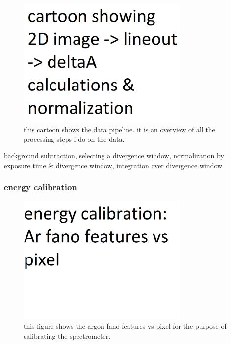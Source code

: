 \begin{figure}
	\centering
	\includegraphics[width=0.75\textwidth]{figures/chap4/data_pipeline.png}
	\caption{this cartoon shows the data pipeline. it is an overview of all the processing steps i do on the data.}
	\label{fig:data_pipeline}
\end{figure}

background subtraction, selecting a divergence window, normalization by exposure time \& divergence window, integration over divergence window
\subsubsection{energy calibration}

\begin{figure}
	\centering
	\includegraphics[width=0.75\textwidth]{figures/chap4/Ar_fano_cal.png}
	\caption{this figure shows the argon fano features vs pixel for the purpose of calibrating the spectrometer.}
	\label{fig:Ar_fano_calibration}
\end{figure}




